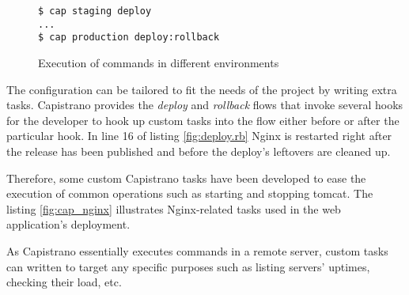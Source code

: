 \begin{figure}[h]
  \texttt{\$ cap staging deploy}\\
  \texttt{...}\\
  \texttt{\$ cap production deploy:rollback}\\
  \caption{Execution of commands in different environments}
  \label{fig:capistrano}
\end{figure}

The configuration can be tailored to fit the needs of the project by writing extra tasks. Capistrano provides the \textit{deploy} and \textit{rollback} flows that invoke several hooks for the developer to hook up custom tasks into the flow either before or after the particular hook. In line 16 of listing \ref{fig:deploy.rb} Nginx is restarted right after the release has been published and before the deploy's leftovers are cleaned up.

Therefore, some custom Capistrano tasks have been developed to ease the execution of common operations such as starting and stopping tomcat. The listing \ref{fig:cap_nginx} illustrates Nginx-related tasks used in the web application's deployment.


As Capistrano essentially executes commands in a remote server, custom tasks can written to target any specific purposes such as listing servers' uptimes, checking their load, etc.